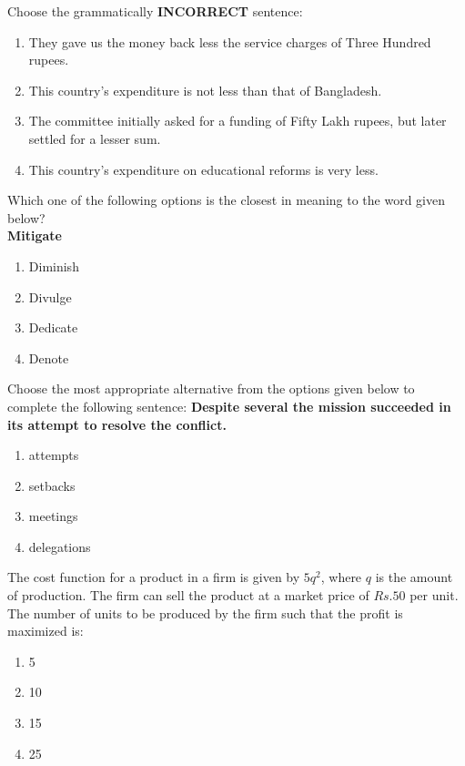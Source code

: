 \item Choose the grammatically \textbf{INCORRECT} sentence:
    \begin{enumerate}
        \item They gave us the money back less the service charges of Three Hundred rupees.
        \item This country's expenditure is not less than that of Bangladesh.
        \item The committee initially asked for a funding of Fifty Lakh rupees, but later settled for a lesser sum.
        \item This country's expenditure on educational reforms is very less.
    \end{enumerate}

\item Which one of the following options is the closest in meaning to the word given below?\\
\textbf{Mitigate}
    \begin{enumerate}
        \item Diminish
        \item Divulge
        \item Dedicate
        \item Denote
    \end{enumerate}

\item Choose the most appropriate alternative from the options given below to complete the following sentence:  
\textbf{Despite several \underline{\hspace{1cm}} the mission succeeded in its attempt to resolve the conflict.}
    \begin{enumerate}
        \item attempts
        \item setbacks
        \item meetings
        \item delegations
    \end{enumerate}

\item The cost function for a product in a firm is given by $5q^2$, where $q$ is the amount of production. The firm can sell the product at a market price of $Rs. 50$ per unit. The number of units to be produced by the firm such that the profit is maximized is:
    \begin{enumerate}
        \item 5
        \item 10
        \item 15
        \item 25
    \end{enumerate}

